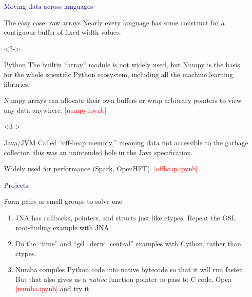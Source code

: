 \documentclass{beamer}
\begin{document}
\begin{frame}{}
\begin{center}
\textcolor{darkblue}{\LARGE Moving data across languages}
\end{center}
\end{frame}

\begin{frame}{The easy case: raw arrays}
\vspace{0.5 cm}
Nearly every language has some construct for a contiguous buffer of fixed-width values.

\vspace{0.25 cm}
\begin{uncoverenv}<2->
\begin{block}{Python}
The builtin ``array'' module is not widely used, but Numpy is the basis for the whole scientific Python ecosystem, including all the machine learning libraries.

\vspace{0.25 cm}
Numpy arrays can allocate their own buffers or wrap arbitrary pointers to view any data anywhere. \hfill \textcolor{red}{[numpy.ipynb]}
\end{block}
\end{uncoverenv}

\vspace{0.25 cm}
\begin{uncoverenv}<3->
\begin{block}{Java/JVM}
Called ``off-heap memory,'' meaning data not accessible to the garbage collector, this was an unintended hole in the Java specification.

\vspace{0.25 cm}
Widely used for performance (Spark, OpenHFT). \hfill \textcolor{red}{[offheap.ipynb]}
\end{block}
\end{uncoverenv}
\end{frame}





\begin{frame}{}
\begin{center}
\textcolor{darkblue}{\LARGE Projects}
\end{center}
\end{frame}

\begin{frame}{Form pairs or small groups to solve one}
\begin{enumerate}
\item JNA has callbacks, pointers, and structs just like ctypes. Repeat the GSL root-finding example with JNA.
\item Do the ``time'' and ``gsl\_deriv\_central'' examples with Cython, rather than ctypes.
\item Numba compiles Python code into native bytecode so that it will run faster. But that also gives us a {\it native} function pointer to pass to C code. Open \textcolor{red}{[numba.ipynb]} and try it.




\end{enumerate}
\end{frame}
\end{document}
